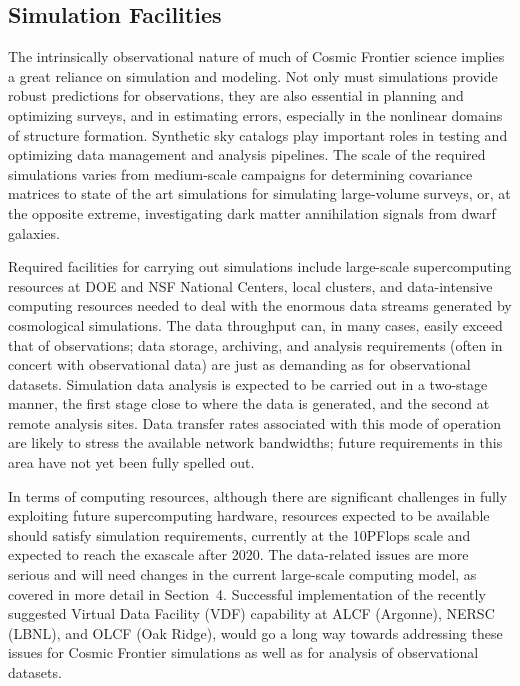 \subsection{Simulation Facilities}

The intrinsically observational nature of much of Cosmic Frontier
science implies a great reliance on simulation and modeling. Not only
must simulations provide robust predictions for observations, they are
also essential in planning and optimizing surveys, and in estimating
errors, especially in the nonlinear domains of structure
formation. Synthetic sky catalogs play important roles in testing and
optimizing data management and analysis pipelines. The scale of the
required simulations varies from medium-scale campaigns for
determining covariance matrices to state of the art simulations for
simulating large-volume surveys, or, at the opposite extreme,
investigating dark matter annihilation signals from dwarf galaxies.

Required facilities for carrying out simulations include large-scale
supercomputing resources at DOE and NSF National Centers, local
clusters, and data-intensive computing resources needed to deal with
the enormous data streams generated by cosmological simulations. The
data throughput can, in many cases, easily exceed that of
observations; data storage, archiving, and analysis requirements
(often in concert with observational data) are just as demanding as
for observational datasets. Simulation data analysis is expected to be
carried out in a two-stage manner, the first stage close to where the
data is generated, and the second at remote analysis sites. Data
transfer rates associated with this mode of operation are likely to
stress the available network bandwidths; future requirements in this
area have not yet been fully spelled out.

In terms of computing resources, although there are significant
challenges in fully exploiting future supercomputing hardware,
resources expected to be available should satisfy simulation
requirements, currently at the 10PFlops scale and expected to reach
the exascale after 2020. The data-related issues are more serious and
will need changes in the current large-scale computing model, as
covered in more detail in Section~4. Successful implementation of the
recently suggested Virtual Data Facility (VDF) capability at ALCF
(Argonne), NERSC (LBNL), and OLCF (Oak Ridge), would go a long way
towards addressing these issues for Cosmic Frontier simulations as
well as for analysis of observational datasets.


